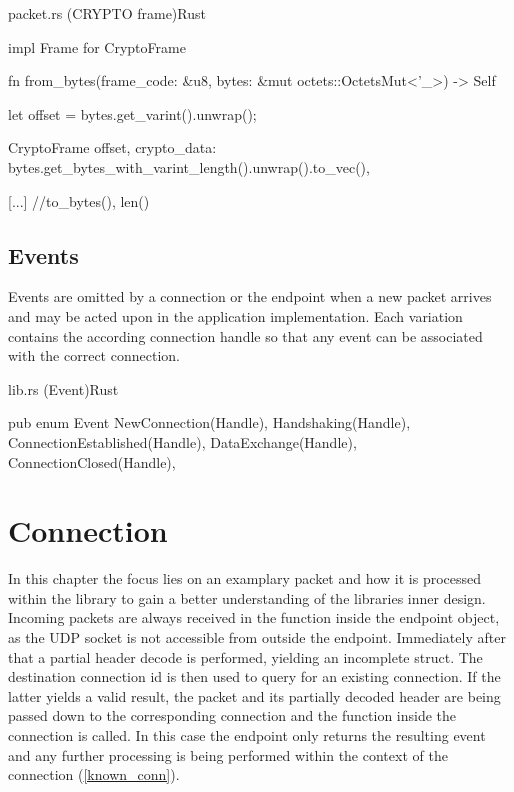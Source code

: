 \begin{codeblock}{packet.rs (CRYPTO frame)}{Rust}
    \begin{rustcode}
        impl Frame for CryptoFrame {
            fn from_bytes(frame_code: &u8, bytes: &mut octets::OctetsMut<'_>) -> Self {
                let offset = bytes.get_varint().unwrap();

                CryptoFrame {
                    offset,
                    crypto_data: bytes.get_bytes_with_varint_length().unwrap().to_vec(),
                }
            }

            [...] //to_bytes(), len()
        }
    \end{rustcode}
\end{codeblock}



\subsection{Events}

Events are omitted by a connection or the endpoint when a new packet arrives and may be acted upon in the application implementation. Each variation
contains the according connection handle so that any event can be associated with the correct connection. 

\begin{codeblock}{lib.rs (Event)}{Rust}
    \begin{rustcode}
        pub enum Event {
            NewConnection(Handle),
            Handshaking(Handle),
            ConnectionEstablished(Handle),
            DataExchange(Handle),
            ConnectionClosed(Handle),
        }
    \end{rustcode}
\end{codeblock}

\section{Connection}

In this chapter the focus lies on an examplary packet and how it is processed within the library to gain a better understanding of the libraries
inner design. Incoming packets are always received in the  function inside the endpoint object, as the UDP socket is
not accessible from outside the endpoint.
Immediately after that a partial header decode is performed, yielding an incomplete  struct. The destination connection
id is then used to query for an existing connection. If the latter yields a valid result, the packet and its partially
decoded header are being passed down to the corresponding connection and the  function inside the connection is called.
In this case the endpoint only returns the resulting event and any further processing is being performed within the context of the
connection (\ref{known_conn}).

